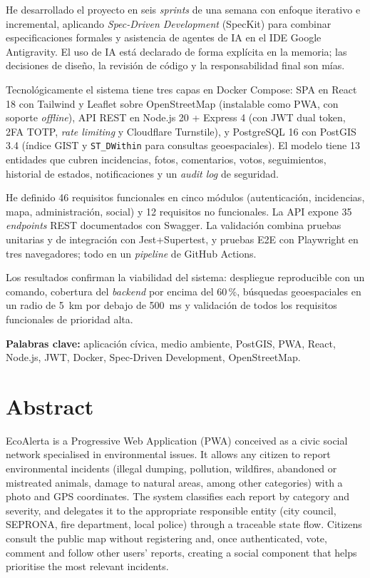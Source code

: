 He desarrollado el proyecto en seis \textit{sprints} de una semana con enfoque iterativo e incremental, aplicando \textit{Spec-Driven Development} (SpecKit) para combinar especificaciones formales y asistencia de agentes de IA en el IDE Google Antigravity. El uso de IA está declarado de forma explícita en la memoria; las decisiones de diseño, la revisión de código y la responsabilidad final son mías.

Tecnológicamente el sistema tiene tres capas en Docker Compose: SPA en React 18 con Tailwind y Leaflet sobre OpenStreetMap (instalable como PWA, con soporte \textit{offline}), API REST en Node.js 20 + Express 4 (con JWT dual token, 2FA TOTP, \textit{rate limiting} y Cloudflare Turnstile), y PostgreSQL 16 con PostGIS 3.4 (índice GIST y \texttt{ST\_DWithin} para consultas geoespaciales). El modelo tiene 13 entidades que cubren incidencias, fotos, comentarios, votos, seguimientos, historial de estados, notificaciones y un \textit{audit log} de seguridad.

He definido 46 requisitos funcionales en cinco módulos (autenticación, incidencias, mapa, administración, social) y 12 requisitos no funcionales. La API expone 35 \textit{endpoints} REST documentados con Swagger. La validación combina pruebas unitarias y de integración con Jest+Supertest, y pruebas E2E con Playwright en tres navegadores; todo en un \textit{pipeline} de GitHub Actions.

Los resultados confirman la viabilidad del sistema: despliegue reproducible con un comando, cobertura del \textit{backend} por encima del 60\,\%, búsquedas geoespaciales en un radio de 5~km por debajo de 500~ms y validación de todos los requisitos funcionales de prioridad alta.

\vspace{0.5cm}
\noindent\textbf{Palabras clave:} aplicación cívica, medio ambiente, PostGIS, PWA, React, Node.js, JWT, Docker, Spec-Driven Development, OpenStreetMap.

\clearpage


\chapter*{Abstract}

EcoAlerta is a Progressive Web Application (PWA) conceived as a civic social network specialised in environmental issues. It allows any citizen to report environmental incidents (illegal dumping, pollution, wildfires, abandoned or mistreated animals, damage to natural areas, among other categories) with a photo and GPS coordinates. The system classifies each report by category and severity, and delegates it to the appropriate responsible entity (city council, SEPRONA, fire department, local police) through a traceable state flow. Citizens consult the public map without registering and, once authenticated, vote, comment and follow other users' reports, creating a social component that helps prioritise the most relevant incidents.


